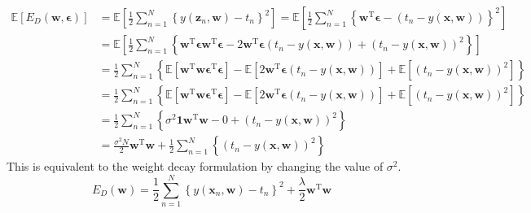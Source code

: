 \documentclass{article}
\begin{document}
$$\begin{aligned} \mathbb{E}\left[E_{D}(\mathbf{w}, \boldsymbol{\epsilon})\right] &=\mathbb{E}\left[\frac{1}{2} \sum_{n=1}^{N}\left\{y\left(\mathbf{z}_{n}, \mathbf{w}\right)-t_{n}\right\}^{2}\right]=\mathbb{E}\left[\frac{1}{2} \sum_{n=1}^{N}\left\{\mathbf{w}^{\mathrm{T}} \boldsymbol{\epsilon}-\left(t_{n}-y(\mathbf{x}, \mathbf{w})\right)\right\}^{2}\right] \\ &=\mathbb{E}\left[\frac{1}{2} \sum_{n=1}^{N}\left\{\mathbf{w}^{\mathrm{T}} \boldsymbol{\epsilon} \mathbf{w}^{\mathrm{T}} \boldsymbol{\epsilon}-2 \mathbf{w}^{\mathrm{T}} \boldsymbol{\epsilon}\left(t_{n}-y(\mathbf{x}, \mathbf{w})\right)+\left(t_{n}-y(\mathbf{x}, \mathbf{w})\right)^{2}\right\}\right] \\ &=\frac{1}{2} \sum_{n=1}^{N}\left\{\mathbb{E}\left[\mathbf{w}^{\mathrm{T}} \mathbf{w} \boldsymbol{\epsilon}^{\mathrm{T}} \boldsymbol{\epsilon}\right]-\mathbb{E}\left[2 \mathbf{w}^{\mathrm{T}} \boldsymbol{\epsilon}\left(t_{n}-y(\mathbf{x}, \mathbf{w})\right)\right]+\mathbb{E}\left[\left(t_{n}-y(\mathbf{x}, \mathbf{w})\right)^{2}\right]\right\} \\ &=\frac{1}{2} \sum_{n=1}^{N}\left\{\mathbb{E}\left[\mathbf{w}^{\mathrm{T}} \mathbf{w} \boldsymbol{\epsilon}^{\mathrm{T}} \boldsymbol{\epsilon}\right]-\mathbb{E}\left[2 \mathbf{w}^{\mathrm{T}} \boldsymbol{\epsilon}\left(t_{n}-y(\mathbf{x}, \mathbf{w})\right)\right]+\mathbb{E}\left[\left(t_{n}-y(\mathbf{x}, \mathbf{w})\right)^{2}\right]\right\} \\ &=\frac{1}{2} \sum_{n=1}^{N}\left\{\sigma^{2} \mathbf{1} \mathbf{w}^{\mathrm{T}} \mathbf{w}-0+\left(t_{n}-y(\mathbf{x}, \mathbf{w})\right)^{2}\right\} \\ &=\frac{\sigma^{2} N}{2} \mathbf{w}^{\mathrm{T}} \mathbf{w}+\frac{1}{2} \sum_{n=1}^{N}\left\{\left(t_{n}-y(\mathbf{x}, \mathbf{w})\right)^{2}\right\} \end{aligned}$$
This is equivalent to the weight decay formulation by changing the value of $\sigma^{2}$.
$$
E_{D}(\mathbf{w})=\frac{1}{2} \sum_{n=1}^{N}\left\{y\left(\mathbf{x}_{n}, \mathbf{w}\right)-t_{n}\right\}^{2}+\frac{\lambda}{2} \mathbf{w}^{\mathrm{T}} \mathbf{w}
$$



\end{document}
